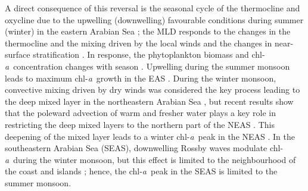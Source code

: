 \documentclass[authoryear,review,11pt]{elsarticle}
\newcommand{\chla}{chl-{\emph{a}}}
\begin{document}
A direct consequence of this reversal is the seasonal cycle of the thermocline \citep{shetye1990hydrography, shetye19911517, vijith2022circulation} and oxycline \citep{desousa1996seasonal, schmidt2020seasonal} due to the upwelling (downwelling) favourable conditions during summer (winter) in the eastern Arabian Sea \citep[EAS;][]{shetye1990hydrography, shetye19911517, vijith2022circulation}; the MLD responds to the changes in the thermocline and the mixing driven by the local winds and the changes in near-surface stratification \citep{shetye19911517, prasad1996mixed, prasannakumara20051848}. In response, the phytoplankton biomass and \chla\ concentration changes with season \citep{subrahmanyan1960studies, banse1968hydrography, prasannakumara20051848, levy2007basin, mccreary2009biophysical, vijith2016consequences, shankar2019role}. Upwelling during the summer monsoon leads to maximum \chla\ growth in the EAS \citep{banse1968hydrography, banse2000geographical, mccreary2009biophysical, hood2017biogeochemical, bemal2018picophytoplankton, shi2022phytoplankton}. During the winter monsoon, convective mixing driven by dry winds was considered the key process leading to the deep mixed layer in the northeastern Arabian Sea \citep[NEAS;][]{banse1968hydrography, shetye1992does, madhupratap1996mechanism, mccreary1996four, levy2007basin}, but recent results show that the poleward advection of warm and fresher water plays a key role in restricting the deep mixed layers to the northern part of the NEAS \citep{shankar2016inhibition}.  This deepening of the mixed layer leads to a winter \chla\ peak in the NEAS \citep{madhupratap1996mechanism, mccreary1996four, levy2007basin,  vijith2016consequences,shankar2016inhibition, keerthi2017physical, shi2022phytoplankton}. In the southeastern Arabian Sea (SEAS), downwelling Rossby waves modulate \chla\ during the winter monsoon, but this effect is limited to the neighbourhood of the coast and islands \citep{amol2020modulation}; hence, the \chla\ peak in the SEAS is limited to the summer monsoon. 
\end{document}
